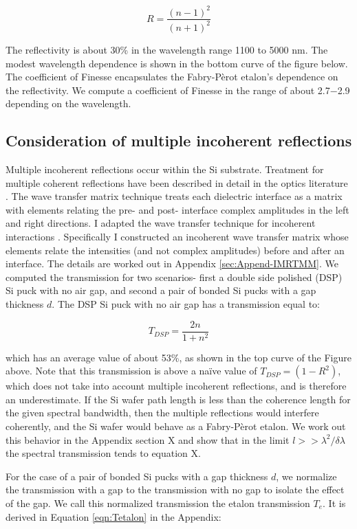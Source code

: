 \documentclass[osajnl,preprint,showpacs,superscriptaddress,12pt]{revtex4-1} %
\begin{document}
$$
R = \frac{(n-1)^2}{(n+1)^2}
$$

The reflectivity is about 30\% in the wavelength range 1100 to 5000 nm.  The modest wavelength dependence is shown in the bottom curve of the figure below.  The coefficient of Finesse\cite{2007fuph.book.....S} encapsulates the Fabry-P\`erot etalon's dependence on the reflectivity.  We compute a coefficient of Finesse in the range of about 2.7$-$2.9 depending on the wavelength.


\subsection{Consideration of multiple incoherent reflections}
\label{secTheory}
Multiple incoherent reflections occur within the Si substrate.  Treatment for multiple coherent reflections have been described in detail in the optics literature \cite{2007fuph.book.....S}.  The wave transfer matrix technique treats each dielectric interface as a matrix with elements relating the pre- and post- interface complex amplitudes in the left and right directions.  I adapted the wave transfer technique for incoherent interactions \cite{2002ApOpt..41.3978K}.  Specifically I constructed an incoherent wave transfer matrix whose elements relate the intensities (and not complex amplitudes) before and after an interface.  The details are worked out in Appendix \ref{sec:Append-IMRTMM}.  We computed the transmission for two scenarios- first a double side polished (DSP) Si puck with no air gap, and second a pair of bonded Si pucks with a gap thickness $d$.  The DSP Si puck with no air gap has a transmission equal to:

$$
T_{DSP} = \frac{2n}{1+n^2}
$$

which has an average value of about 53\%, as shown in the top curve of the Figure above.  Note that this transmission is above a na\"ive value of $T_{DSP}=(1-R^2)$, which does not take into account multiple incoherent reflections, and is therefore an underestimate.  If the Si wafer path length is less than the coherence length for the given spectral bandwidth, then the multiple reflections would interfere coherently, and the Si wafer would behave as a Fabry-P\`erot etalon.  We work out this behavior in the Appendix section X and show that in the limit $l>> \lambda^2 / \delta \lambda $ the spectral transmission tends to equation X.  

For the case of a pair of bonded Si pucks with a gap thickness $d$, we normalize the transmission with a gap to the transmission with no gap to isolate the effect of the gap.  We call this normalized transmission the etalon transmission $T_{e}$.  It is derived in Equation \ref{eqn:Tetalon} in the Appendix:
\end{document}

